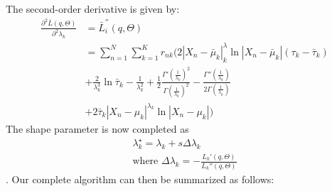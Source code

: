 \documentclass[conference]{IEEEtran}
\begin{document}
        The second-order derivative is given by:
        \begin{equation}
            \begin{split}
                \frac{\partial^2 \bar{L}(q, \Theta)}{\partial^2 \lambda_k} &= \bar{L}_i^{''}(q, \Theta)  \\
                &=\sum_{n=1}^{N}\sum_{k=1}^{K} r_{nk}(2 |X_n - \bar{\mu}_k|^\lambda_k \ln |X_n - \bar{\mu}_k|(\tau_k - \bar{\tau}_k) \\
                &+ \frac{2}{\lambda_k^3} \ln \bar{\tau}_k - \frac{1}{\lambda_k^2}  + \frac{1}{2}\frac{\Gamma'(\frac{1}{\lambda_k})^2}{\Gamma(\frac{1}{\lambda_k})^2}- \frac{\Gamma''(\frac{1}{\lambda_k})}{2\Gamma(\frac{1}{\lambda_k})} \\
                &+ 2\bar{\tau}_k|X_n - \mu_k|^{\lambda_k} \ln |X_n - \mu_k|)  
            \end{split}
        \end{equation}
        The shape parameter is now completed as
        \begin{equation}
            \begin{split}\label{lambda}
                \lambda_k^\star = \lambda_k + s \Delta \lambda_k   \\
                \text{where }
                \Delta\lambda_k = - \frac{L_k'(q, \Theta)}{L_k''(q, \Theta)}
            \end{split}
        \end{equation}
        . Our complete algorithm can then be summarized as follows: 
        
\end{document}
